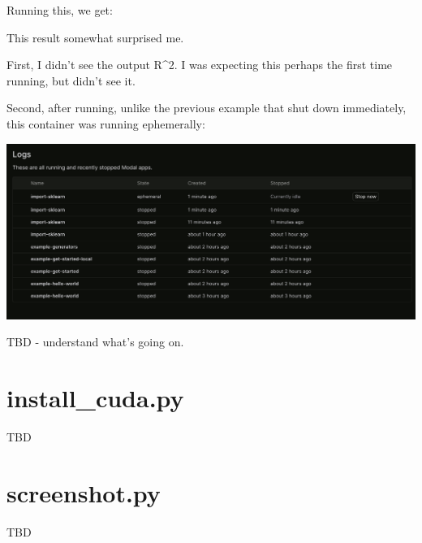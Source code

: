 \documentclass[
  letterpaper,
  DIV=11,
  numbers=noendperiod]{scrreprt}
\newenvironment{Shaded}{\begin{snugshade}}{\end{snugshade}}
\newcommand{\AttributeTok}[1]{\textcolor[rgb]{0.40,0.45,0.13}{#1}}
\newcommand{\ExtensionTok}[1]{\textcolor[rgb]{0.00,0.23,0.31}{#1}}
\newcommand{\NormalTok}[1]{\textcolor[rgb]{0.00,0.23,0.31}{#1}}
\begin{document}
Running this, we get:

\begin{Shaded}
\end{Shaded}

This result somewhat surprised me.

First, I didn't see the output R\^{}2. I was expecting this perhaps the
first time running, but didn't see it.

Second, after running, unlike the previous example that shut down
immediately, this container was running ephemerally:

\includegraphics{images/02_building_containers/sklearn-r2.png}

TBD - understand what's going on.

\hypertarget{install_cuda.py}{%
\section{install\_cuda.py}\label{install_cuda.py}}

TBD

\hypertarget{screenshot.py}{%
\section{screenshot.py}\label{screenshot.py}}

TBD
\end{document}
